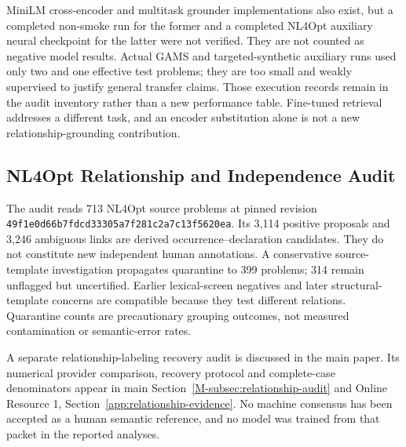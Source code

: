 MiniLM cross-encoder and multitask grounder implementations also exist, but a completed non-smoke run for the former and a completed NL4Opt auxiliary neural checkpoint for the latter were not verified. They are not counted as negative model results. Actual GAMS and targeted-synthetic auxiliary runs used only two and one effective test problems; they are too small and weakly supervised to justify general transfer claims. Those execution records remain in the audit inventory rather than a new performance table. Fine-tuned retrieval addresses a different task, and an encoder substitution alone is not a new relationship-grounding contribution.

\subsection{NL4Opt Relationship and Independence Audit}
\label{app:nl4opt-audit}

The audit reads 713 NL4Opt source problems at pinned revision \texttt{49f1e0d66b7fdcd33305a7f281c2a7c13f5620ea}. Its 3,114 positive proposals and 3,246 ambiguous links are derived occurrence--declaration candidates. They do not constitute new independent human annotations. A conservative source-template investigation propagates quarantine to 399 problems; 314 remain unflagged but uncertified. Earlier lexical-screen negatives and later structural-template concerns are compatible because they test different relations. Quarantine counts are precautionary grouping outcomes, not measured contamination or semantic-error rates.

A separate relationship-labeling recovery audit is discussed in the main paper. Its numerical provider comparison, recovery protocol and complete-case denominators appear in main Section~\ref{M-subsec:relationship-audit} and Online Resource 1, Section~\ref{app:relationship-evidence}. No machine consensus has been accepted as a human semantic reference, and no model was trained from that packet in the reported analyses.
